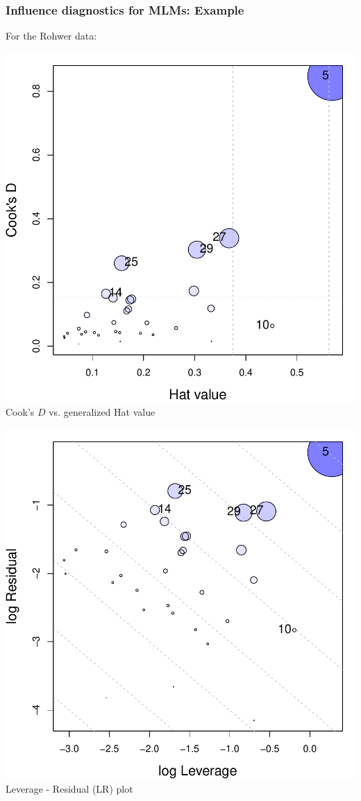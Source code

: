\begin{frame}
  \frametitle{Influence diagnostics for MLMs: Example}
  For the Rohwer data:

  \begin{minipage}[c]{.5\textwidth}
   \includegraphics[width=1\linewidth,clip]{figures/rohwer-influence-cookd}
   \\ \centering Cook's $D$ vs. generalized Hat value
   \end{minipage}%
  \hfill
  \begin{minipage}[c]{.5\textwidth}
   \includegraphics[width=1\linewidth,clip]{figures/rohwer-influence-LR}
   \\ \centering Leverage - Residual (LR) plot
  \end{minipage}

\end{frame}

